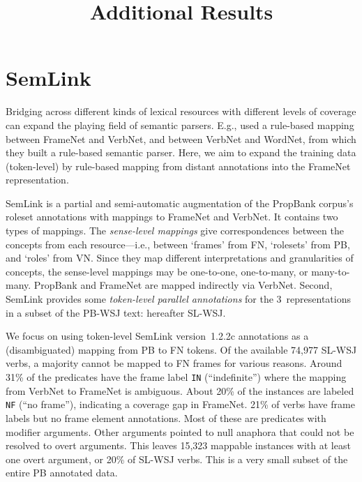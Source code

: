 \documentclass[a4paper,11pt,titlepage]{article}
\begin{document}
\title{Additional Results}

\maketitle

\section{SemLink}

Bridging across different kinds of lexical resources 
with different levels of coverage can expand the playing field of semantic parsers.
E.g., \citet{shi-05} used a rule-based mapping between FrameNet and VerbNet, and between VerbNet and WordNet, 
from which they built a rule-based semantic parser.
Here, we aim to expand the training data (token-level) by rule-based mapping 
from distant annotations into the FrameNet representation.



SemLink \citep{bonial-13} is a partial and semi-automatic augmentation
of the PropBank corpus's roleset annotations with mappings to FrameNet and VerbNet.
It contains two types of mappings. The \emph{sense-level mappings} give correspondences between the concepts
from each resource---i.e., between `frames' from FN, `rolesets' from PB, and `roles' from VN.
Since they map different interpretations and granularities
of concepts, the sense-level mappings may be one-to-one, one-to-many, or many-to-many.
PropBank and FrameNet are mapped indirectly via VerbNet. %
Second, SemLink provides some \emph{token-level parallel annotations}
for the 3~representations in a subset of the PB-WSJ text: hereafter SL-WSJ.

We focus on using token-level SemLink version~1.2.2c annotations as a (disambiguated) mapping from PB to FN tokens.
Of the available 74,977 SL-WSJ verbs, a majority cannot be mapped to FN frames for various reasons.
Around 31\% of the predicates have the frame label \texttt{IN} (``indefinite'') where the mapping from VerbNet to FrameNet is ambiguous.
About 20\% of the instances are labeled \texttt{NF} (``no frame''), indicating a coverage gap in FrameNet.
21\% of verbs have frame labels but no frame element annotations. Most of these are predicates with modifier arguments.
Other arguments pointed to null anaphora that could not be resolved to overt arguments.
This leaves 15,323 mappable instances with at least one overt argument, or 20\% of SL-WSJ verbs. This is a very small
subset of the entire PB annotated data.
\end{document}
